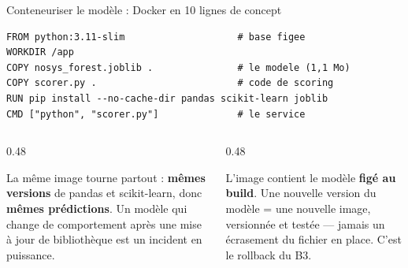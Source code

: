 \begin{frame}[fragile]{Conteneuriser le modèle : Docker en 10 lignes de concept}
\small
\begin{codebox}[L'image = modèle + code de scoring + dépendances figées]
\begin{lstlisting}
FROM python:3.11-slim                    # base figee
WORKDIR /app
COPY nosys_forest.joblib .               # le modele (1,1 Mo)
COPY scorer.py .                         # code de scoring
RUN pip install --no-cache-dir pandas scikit-learn joblib
CMD ["python", "scorer.py"]              # le service
\end{lstlisting}
\end{codebox}
\begin{columns}[t]
\begin{column}{0.48\textwidth}
\begin{kbox}
La même image tourne partout : \textbf{mêmes versions} de pandas et
scikit-learn, donc \textbf{mêmes prédictions}. Un modèle qui change de
comportement après une mise à jour de bibliothèque est un incident en
puissance.
\end{kbox}
\end{column}
\begin{column}{0.48\textwidth}
\begin{wbox}
L'image contient le modèle \textbf{figé au build}. Une nouvelle version du
modèle = une nouvelle image, versionnée et testée --- jamais un écrasement
du fichier en place. C'est le rollback du B3.
\end{wbox}
\end{column}
\end{columns}
\end{frame}

